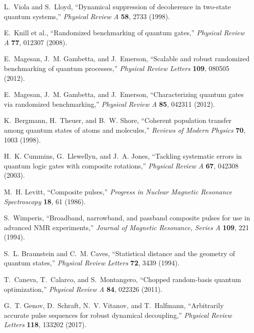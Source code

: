 \documentclass[11pt,a4paper]{article}
\theoremstyle{definition}
\theoremstyle{remark}
\begin{document}
\begin{enumerate}[label={[\arabic*]}]
    \item L.~Viola and S.~Lloyd, ``Dynamical suppression of decoherence in two-state quantum systems,'' \emph{Physical Review A} \textbf{58}, 2733 (1998).

    \item E.~Knill et al., ``Randomized benchmarking of quantum gates,'' \emph{Physical Review A} \textbf{77}, 012307 (2008).

    \item E.~Magesan, J.~M. Gambetta, and J.~Emerson, ``Scalable and robust randomized benchmarking of quantum processes,'' \emph{Physical Review Letters} \textbf{109}, 080505 (2012).

    \item E.~Magesan, J.~M. Gambetta, and J.~Emerson, ``Characterizing quantum gates via randomized benchmarking,'' \emph{Physical Review A} \textbf{85}, 042311 (2012).

    \item K.~Bergmann, H.~Theuer, and B.~W. Shore, ``Coherent population transfer among quantum states of atoms and molecules,'' \emph{Reviews of Modern Physics} \textbf{70}, 1003 (1998).

    \item H.~K. Cummins, G.~Llewellyn, and J.~A. Jones, ``Tackling systematic errors in quantum logic gates with composite rotations,'' \emph{Physical Review A} \textbf{67}, 042308 (2003).

    \item M.~H. Levitt, ``Composite pulses,'' \emph{Progress in Nuclear Magnetic Resonance Spectroscopy} \textbf{18}, 61 (1986).

    \item S.~Wimperis, ``Broadband, narrowband, and passband composite pulses for use in advanced NMR experiments,'' \emph{Journal of Magnetic Resonance, Series A} \textbf{109}, 221 (1994).

    \item S.~L. Braunstein and C.~M. Caves, ``Statistical distance and the geometry of quantum states,'' \emph{Physical Review Letters} \textbf{72}, 3439 (1994).

    \item T.~Caneva, T.~Calarco, and S.~Montangero, ``Chopped random-basis quantum optimization,'' \emph{Physical Review A} \textbf{84}, 022326 (2011).

    \item G.~T. Genov, D.~Schraft, N.~V. Vitanov, and T.~Halfmann, ``Arbitrarily accurate pulse sequences for robust dynamical decoupling,'' \emph{Physical Review Letters} \textbf{118}, 133202 (2017).


\end{enumerate}
\end{document}
